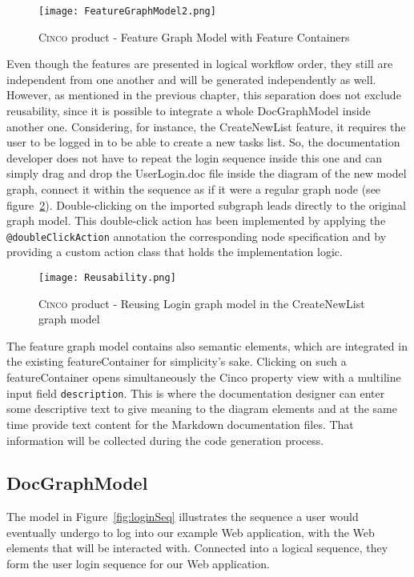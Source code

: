 \begin{figure}[H]
    \centering
    \texttt{[image: FeatureGraphModel2.png]}
    \caption{\textsc{Cinco} product - Feature Graph Model with Feature Containers}
    \label{fig:featGraph}
\end{figure}

Even though the features are presented in logical workflow order, they still are independent from one another and will be generated independently as well. However, as mentioned in the previous chapter, this separation does not exclude reusability, since it is possible to integrate a whole DocGraphModel inside another one. Considering, for instance, the CreateNewList feature, it requires the user to be logged in to be able to create a new tasks list. So, the documentation developer does not have to repeat the login sequence inside this one and can simply drag and drop the UserLogin.doc file inside the diagram of the new model graph, connect it within the sequence as if it were a regular graph node (see figure~\ref{fig:reusability}). Double-clicking on the imported subgraph leads directly to the original graph model. This double-click action has been implemented by applying the \lstinline[language=MGL]{@doubleClickAction} annotation the corresponding node specification and by providing a custom action class that holds the implementation logic.

\begin{figure}[h]
    \centering
    \texttt{[image: Reusability.png]}
    \caption{\textsc{Cinco} product - Reusing Login graph model in the CreateNewList graph model}
    \label{fig:reusability}
\end{figure}

The feature graph model contains also semantic elements, which are integrated in the existing featureContainer for simplicity's sake. Clicking on such a featureContainer opens simultaneously the Cinco property view with a multiline input field \lstinline{description}. This is where the documentation designer can enter some descriptive text to give meaning to the diagram elements and at the same time provide text content for the Markdown documentation files. That information will be collected during the code generation process.

\subsection{DocGraphModel}\label{sec:DocGrahpModElem}

The model in Figure~\ref{fig:loginSeq} illustrates the sequence a user would eventually undergo to log into our example Web application, with the Web elements that will be interacted with. Connected into a logical sequence, they form the user login sequence for our Web application. 

